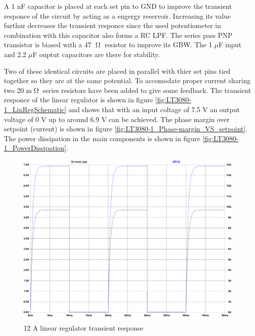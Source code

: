 A 1 nF capacitor is placed at each set pin to GND to improve the transient responce of the circuit by acting as a engergy reservoir. Increasing its value furthur decreases the transient responce since the used potentiometer in combination with this capacitor also forms a RC LPF. The series pass PNP transistor is biased with a 47 $\tcohm$ resistor to improve its GBW. The 1 $\mu$F input and 2.2 $\mu$F ouptut capacitors are there for stability.

Two of these identical circuits are placed in parallel with thier set pins tied together so they are at the same potential. To accomodate proper current sharing two 20 m$\tcohm$ series resistors have been added to give some feedback.
The transient responce of the linear regulator is shown in figure \ref{fig:LT3080-1_LinRegSchematic} and shows that with an input coltage of 7.5 V an output voltage of 0 V up to around 6.9 V can be achieved. The phase margin over setpoint (current) is shown in figure \ref{fig:LT3080-1_Phase-margin_VS_setpoint}. The power dissipation in the main components is shown in figure \ref{fig:LT3080-1_PowerDissipation}.

\begin{figure}[h!]
    \centering
    \includegraphics[scale=0.3]{LT3080-1_Transient-response.pdf}
    \caption{12 A linear regulator transient response}
    \label{fig:LT3080-1_Transient-response}
\end{figure}

